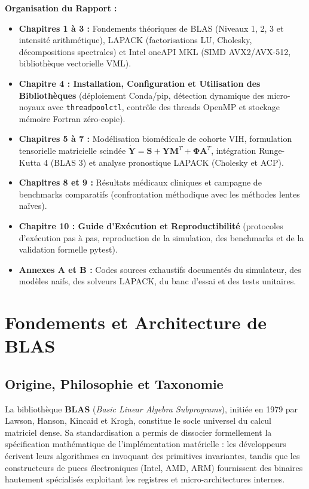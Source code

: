 \documentclass[11pt,a4paper]{report}
\theoremstyle{plain}
\theoremstyle{definition}
\theoremstyle{remark}
\begin{document}
\vspace{0.4cm}
\noindent\textbf{Organisation du Rapport :}
\begin{itemize}
    \item \textbf{Chapitres 1 à 3 :} Fondements théoriques de BLAS (Niveaux 1, 2, 3 et intensité arithmétique), LAPACK (factorisations LU, Cholesky, décompositions spectrales) et Intel oneAPI MKL (SIMD AVX2/AVX-512, bibliothèque vectorielle VML).
    \item \textbf{Chapitre 4 : Installation, Configuration et Utilisation des Bibliothèques} (déploiement Conda/pip, détection dynamique des micro-noyaux avec \texttt{threadpoolctl}, contrôle des threads OpenMP et stockage mémoire Fortran zéro-copie).
    \item \textbf{Chapitres 5 à 7 :} Modélisation biomédicale de cohorte VIH, formulation tensorielle matricielle scindée $\dot{\mathbf{Y}} = \mathbf{S} + \mathbf{Y}\mathbf{M}^T + \mathbf{\Phi}\mathbf{A}^T$, intégration Runge-Kutta 4 (BLAS 3) et analyse pronostique LAPACK (Cholesky et ACP).
    \item \textbf{Chapitres 8 et 9 :} Résultats médicaux cliniques et campagne de benchmarks comparatifs (confrontation méthodique avec les méthodes lentes naïves).
    \item \textbf{Chapitre 10 : Guide d'Exécution et Reproductibilité} (protocoles d'exécution pas à pas, reproduction de la simulation, des benchmarks et de la validation formelle pytest).
    \item \textbf{Annexes A et B :} Codes sources exhaustifs documentés du simulateur, des modèles naïfs, des solveurs LAPACK, du banc d'essai et des tests unitaires.
\end{itemize}

\chapter{Fondements et Architecture de BLAS}

\section{Origine, Philosophie et Taxonomie}
La bibliothèque \textbf{BLAS} (\textit{Basic Linear Algebra Subprograms}), initiée en 1979 par Lawson, Hanson, Kincaid et Krogh, constitue le socle universel du calcul matriciel dense. Sa standardisation a permis de dissocier formellement la spécification mathématique de l'implémentation matérielle : les développeurs écrivent leurs algorithmes en invoquant des primitives invariantes, tandis que les constructeurs de puces électroniques (Intel, AMD, ARM) fournissent des binaires hautement spécialisés exploitant les registres et micro-architectures internes.
\end{document}
